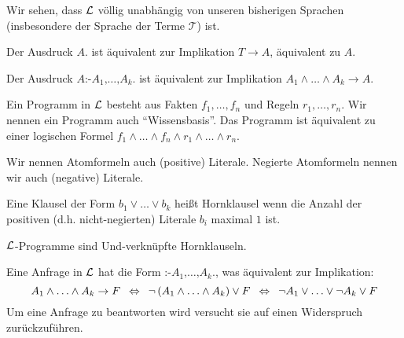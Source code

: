 Wir sehen, dass $\mathcal{L}$ völlig unabhängig von unseren bisherigen Sprachen (insbesondere der Sprache der Terme $\mathcal{T}$) ist.

\begin{defn} \quad 
\begin{\whichenum}
\item Der Ausdruck $A\texttt{.}$
ist äquivalent zur Implikation $T \to A$, äquivalent zu $A$.
\item Der Ausdruck $A  \texttt{:-}  A_1  \texttt{,}  \ldots  \texttt{,}  A_k  \texttt{.}$
ist äquivalent zur Implikation $A_1 \wedge \ldots \wedge A_k \to A$.
\item Ein Programm in $\mathcal{L}$ besteht aus Fakten $f_1,\ldots,f_n$ und Regeln $r_1,\ldots,r_n$. Wir nennen ein Programm auch ``Wissensbasis''.
Das Programm ist äquivalent zu einer logischen Formel $f_1 \wedge \ldots \wedge f_n \wedge r_1 \wedge \ldots \wedge r_n$.
\end{\whichenum}
\end{defn}

\begin{defn}[Literal]
Wir nennen Atomformeln auch (positive) Literale.
Negierte Atomformeln nennen wir auch (negative) Literale.
\end{defn}

\begin{defn}[Hornklausel]
Eine Klausel der Form $b_1 \vee \ldots \vee b_k$ heißt Hornklausel wenn die Anzahl der positiven (d.h. nicht-negierten)
Literale $b_i$ maximal $1$ ist.
\end{defn}

$\mathcal{L}$-Programme sind Und-verknüpfte Hornklauseln.

\begin{defn}
Eine Anfrage in $\mathcal{L}$ hat die Form $\texttt{:-}  A_1  \texttt{,}  \ldots  \texttt{,}  A_k  \texttt{.}$,
was äquivalent zur Implikation:
\[A_1 \wedge \ldots \wedge A_k \to F \; \:\Leftrightarrow\: \; \neg \left(A_1 \wedge \ldots \wedge A_k\right) \vee F \; \:\Leftrightarrow\: \; \neg A_1 \vee \ldots \vee \neg A_k \vee F\]
Um eine Anfrage zu beantworten wird versucht sie auf einen Widerspruch zurückzuführen.
\end{defn}

